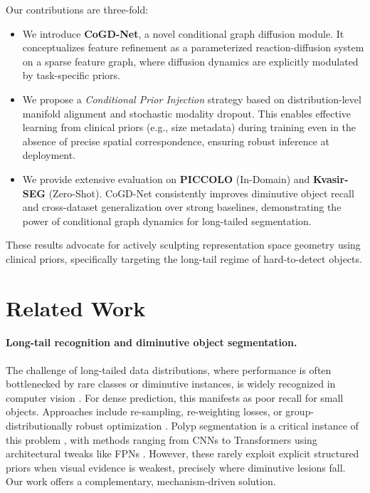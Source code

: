 \documentclass{article}
\begin{document}
Our contributions are three-fold:
\begin{itemize}
    \item We introduce \textbf{CoGD-Net}, a novel conditional graph diffusion module. It conceptualizes feature refinement as a parameterized reaction-diffusion system on a sparse feature graph, where diffusion dynamics are explicitly modulated by task-specific priors.
    \item We propose a \emph{Conditional Prior Injection} strategy based on distribution-level manifold alignment and stochastic modality dropout. This enables effective learning from clinical priors (e.g., size metadata) during training even in the absence of precise spatial correspondence, ensuring robust inference at deployment.
    \item We provide extensive evaluation on \textbf{PICCOLO} (In-Domain) and \textbf{Kvasir-SEG} (Zero-Shot). CoGD-Net consistently improves diminutive object recall and cross-dataset generalization over strong baselines, demonstrating the power of conditional graph dynamics for long-tailed segmentation.
\end{itemize}
These results advocate for actively sculpting representation space geometry using clinical priors, specifically targeting the long-tail regime of hard-to-detect objects.

\section{Related Work}

\paragraph{Long-tail recognition and diminutive object segmentation.}
The challenge of long-tailed data distributions, where performance is often bottlenecked by rare classes or diminutive instances, is widely recognized in computer vision \cite{Cui2019ClassBalanced,Sagawa2020GroupDRO}. For dense prediction, this manifests as poor recall for small objects. Approaches include re-sampling, re-weighting losses, or group-distributionally robust optimization \cite{Sagawa2020GroupDRO}. Polyp segmentation is a critical instance of this problem \cite{Fan2020PraNet,Huang2021HarDNetMSEG}, with methods ranging from CNNs \cite{Ronneberger2015UNet} to Transformers \cite{Xie2021SegFormer,Duc2022ColonFormer} using architectural tweaks like FPNs \cite{Lin2017FPN}. However, these rarely exploit explicit structured priors when visual evidence is weakest, precisely where diminutive lesions fall. Our work offers a complementary, mechanism-driven solution.
\end{document}
